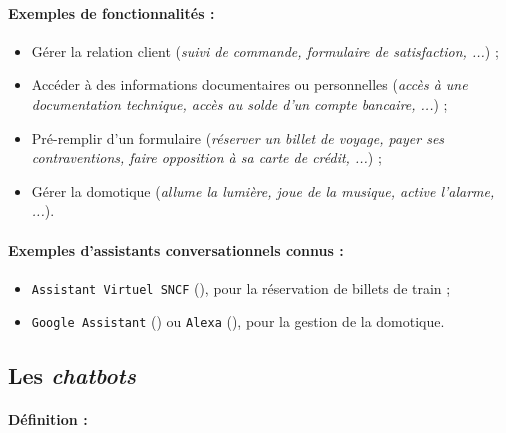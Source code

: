 		\paragraph{Exemples de fonctionnalités :}
		
			\begin{itemize}
				\item Gérer la relation client (\textit{suivi de commande, formulaire de satisfaction, ...}) ;
				\item Accéder à des informations documentaires ou personnelles (\textit{accès à une documentation technique, accès au solde d'un compte bancaire, ...}) ;
				\item Pré-remplir d'un formulaire (\textit{réserver un billet de voyage, payer ses contraventions, faire opposition à sa carte de crédit, ...}) ;
				\item Gérer la domotique (\textit{allume la lumière, joue de la musique, active l'alarme, ...}).
			\end{itemize}
		
		\paragraph{Exemples d'assistants conversationnels connus :}
		
			\begin{itemize}
				\item \texttt{Assistant Virtuel SNCF} (\cite{sncf:2018:agent-virtuel-sncf}), pour la réservation de billets de train ;
				\item \texttt{Google Assistant} (\cite{google:2016:google-assistant-your}) ou \texttt{Alexa} (\cite{alexa-internet:2018:keyword-research-competitor}), pour la gestion de la domotique.
			\end{itemize}
	
	
	\subsection{Les \textit{chatbots} }
	\label{annex:B.1.2-CHATBOT-CLASSIFICATION-CHAT-ORIENTED}
	
		\paragraph{Définition :}
		
